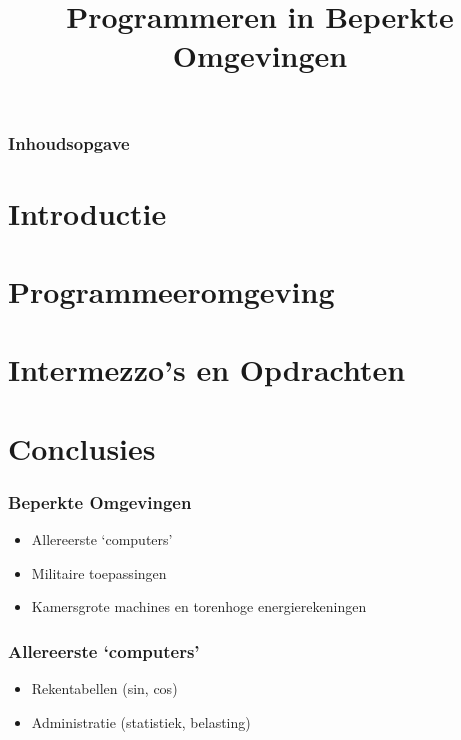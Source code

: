 \documentclass[aspectratio=43]{uva-inf-presentation}
\title{Programmeren in Beperkte Omgevingen}
\begin{document}
\begin{titelframe}
\titlepage

\end{titelframe}

\begin{frame}
\frametitle{Inhoudsopgave}
\tableofcontents
\end{frame}


\section{Introductie}
\section{Programmeeromgeving}
\section{Intermezzo's en Opdrachten}

\section{Conclusies}


\begin{frame}
\frametitle{Beperkte Omgevingen}

\begin{itemize}
\item Allereerste `computers'
\item Militaire toepassingen
\item Kamersgrote machines en torenhoge energierekeningen
\end{itemize}

\end{frame}


\begin{frame}
\frametitle{Allereerste `computers'}

\begin{itemize}
\item Rekentabellen (sin, cos)
\item Administratie (statistiek, belasting)
\end{itemize}

\end{frame}
\end{document}
